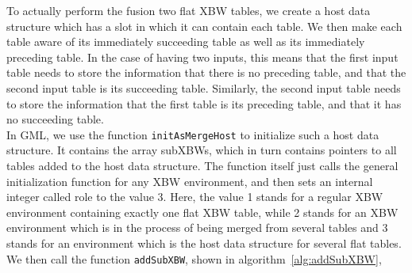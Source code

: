 \documentclass[a4paper,12pt,twoside,BCOR=10mm]{scrbook}
\begin{document}
To actually perform the fusion two flat XBW tables, we create 
a host data structure which has a slot in which it can contain each table. 
We then make each table aware of its immediately succeeding table as well as its immediately preceding table. 
In the case of having two inputs, this means that the first input table needs to store the information 
that there is no preceding table, and that the second input table is its succeeding table. 
Similarly, the second input table needs to store the information that the first table is 
its preceding table, and that it has no succeeding table. \\
In GML, we use the function \texttt{initAsMergeHost} to initialize such a host data structure. 
It contains the array subXBWs, which in turn contains pointers to all tables added to the host data structure. 
The function itself just calls the general initialization function for any XBW environment, 
and then sets an internal integer called role to the value 3. 
Here, the value 1 stands for a regular XBW environment containing exactly one flat XBW table, 
while 2 stands for an XBW environment which is in the process of being merged from several tables 
and 3 stands for an environment which is the host data structure for several flat tables. \\
We then call the function \texttt{addSubXBW}, shown in algorithm~\ref{alg:addSubXBW}, 
\end{document}

